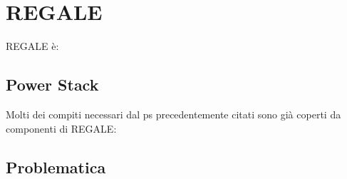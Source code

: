 \chapter{REGALE}
REGALE è:
\section{Power Stack}
Molti dei compiti necessari dal ps precedentemente citati sono già coperti da componenti di REGALE:
\section{Problematica}
